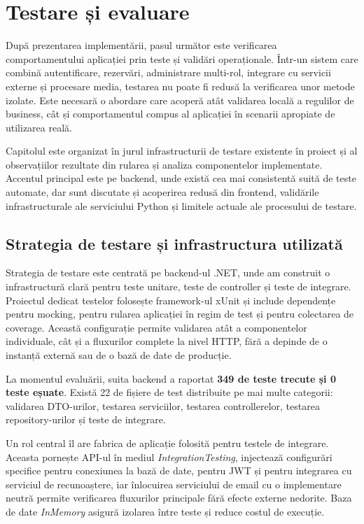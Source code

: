 \chapter{Testare și evaluare}

După prezentarea implementării, pasul următor este verificarea comportamentului aplicației prin teste și validări operaționale. Într-un sistem care combină autentificare, rezervări, administrare multi-rol, integrare cu servicii externe și procesare media, testarea nu poate fi redusă la verificarea unor metode izolate. Este necesară o abordare care acoperă atât validarea locală a regulilor de business, cât și comportamentul compus al aplicației în scenarii apropiate de utilizarea reală.

Capitolul este organizat în jurul infrastructurii de testare existente în proiect și al observațiilor rezultate din rularea și analiza componentelor implementate. Accentul principal este pe backend, unde există cea mai consistentă suită de teste automate, dar sunt discutate și acoperirea redusă din frontend, validările infrastructurale ale serviciului Python și limitele actuale ale procesului de testare.

\section{Strategia de testare și infrastructura utilizată}

Strategia de testare este centrată pe backend-ul .NET, unde am construit o infrastructură clară pentru teste unitare, teste de controller și teste de integrare. Proiectul dedicat testelor folosește framework-ul xUnit \citep{xunit} și include dependențe pentru mocking, pentru rularea aplicației în regim de test și pentru colectarea de coverage. Această configurație permite validarea atât a componentelor individuale, cât și a fluxurilor complete la nivel HTTP, fără a depinde de o instanță externă sau de o bază de date de producție.

La momentul evaluării, suita backend a raportat \textbf{349 de teste trecute și 0 teste eșuate}. Există 22 de fișiere de test distribuite pe mai multe categorii: validarea DTO-urilor, testarea serviciilor, testarea controllerelor, testarea repository-urilor și teste de integrare.

Un rol central îl are fabrica de aplicație folosită pentru testele de integrare. Aceasta pornește API-ul în mediul \emph{IntegrationTesting}, injectează configurări specifice pentru conexiunea la bază de date, pentru JWT și pentru integrarea cu serviciul de recunoaștere, iar înlocuirea serviciului de email cu o implementare neutră permite verificarea fluxurilor principale fără efecte externe nedorite. Baza de date \emph{InMemory} asigură izolarea între teste și reduce costul de execuție.

